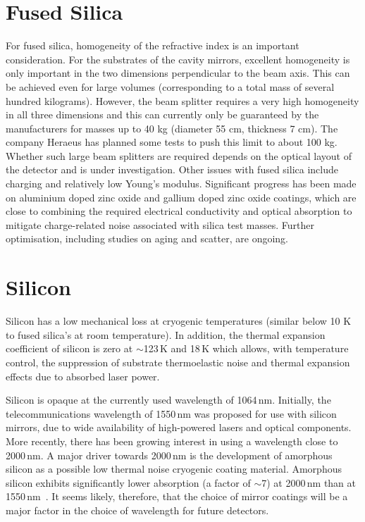  

\section{Fused Silica} 
For fused silica, homogeneity of the refractive index is an important consideration. For the substrates of the cavity mirrors, excellent homogeneity is only important in the two dimensions perpendicular to the beam axis. This can be achieved even for large volumes (corresponding to a total mass of several hundred kilograms). However, the beam splitter requires a very high homogeneity in all three dimensions and this can currently only be guaranteed by the manufacturers for masses up to 40 kg (diameter 55 cm, thickness 7 cm). The company Heraeus has planned some tests to push this limit to about 100 kg. Whether such large beam splitters are required depends on the optical layout of the detector and is under investigation. Other issues with fused silica include charging and relatively low Young's modulus. Significant progress has been made on aluminium doped zinc oxide and gallium doped zinc oxide coatings, which are close to combining the required electrical conductivity and optical absorption to mitigate charge-related noise associated with silica test masses. Further optimisation, including studies on aging and scatter, are ongoing.

\section{Silicon}
Silicon has a low mechanical loss at cryogenic temperatures (similar below 10 K to fused silica's at room temperature).
In addition, the thermal expansion coefficient of silicon is zero at $\sim$123\,K and 18\,K which allows, with temperature control, the suppression of substrate thermoelastic noise and thermal expansion effects due to absorbed laser power.

Silicon is opaque at the currently used wavelength of 1064\,nm. Initially, the telecommunications wavelength of 1550\,nm was proposed for use with silicon mirrors, due to wide availability of high-powered lasers and optical components. More recently, there has been growing interest in using a wavelength close to 2000\,nm. A major driver towards 2000\,nm is the development of amorphous silicon as a possible low thermal noise cryogenic coating material. Amorphous silicon exhibits significantly lower absorption (a factor of $\sim$7) at 2000\,nm than at 1550\,nm~\cite{Steinlechner_2018_aSi}. It seems likely, therefore, that the choice of mirror coatings will be a major factor in the choice of wavelength for future detectors. 

